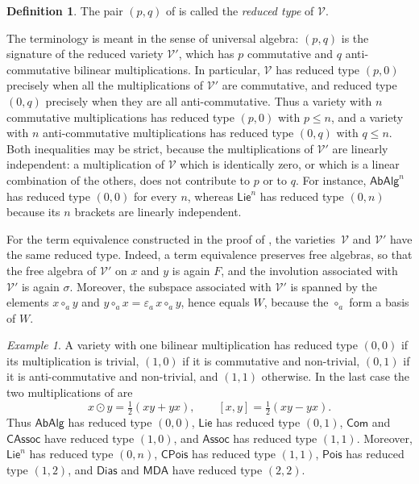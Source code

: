 \documentclass[reqno,a4paper]{amsart}
\theoremstyle{plain}
\theoremstyle{definition}
\newtheorem{definition}[subsection]{Definition}
\theoremstyle{remark}
\newtheorem{example}[subsection]{Example}
\numberwithin{equation}{section}
\newcommand{\V}{\mathcal{V}}
\newcommand{\Assoc}{\ensuremath{\mathsf{Assoc}}}
\newcommand{\Lie}{\ensuremath{\mathsf{Lie}}}
\newcommand{\Pois}{\ensuremath{\mathsf{Pois}}}
\newcommand{\CPois}{\ensuremath{\mathsf{CPois}}}
\newcommand{\CAssoc}{\ensuremath{\mathsf{CAssoc}}}
\newcommand{\Com}{\ensuremath{\mathsf{Com}}}
\newcommand{\AbAlg}{\ensuremath{\mathsf{AbAlg}}}
\newcommand{\Match}{\ensuremath{\mathsf{MDA}}}
\newcommand{\Dias}{\ensuremath{\mathsf{Dias}}}
\begin{document}
\begin{definition}\label{DefReducedType}
The pair $(p,q)$ of  is called the \emph{reduced type} of $\V$.
\end{definition}

The terminology is meant in the sense of universal algebra: $(p,q)$ is the signature of the reduced variety $\V'$, which has $p$ commutative and $q$ anti-commutative bilinear multiplications. In particular, $\V$ has reduced type $(p,0)$ precisely when all the multiplications of $\V'$ are commutative, and reduced type $(0,q)$ precisely when they are all anti-commutative. Thus a variety with $n$ commutative multiplications has reduced type $(p,0)$ with $p\leq n$, and a variety with $n$ anti-commutative multiplications has reduced type $(0,q)$ with $q\leq n$. Both inequalities may be strict, because the multiplications of $\V'$ are linearly independent: a multiplication of $\V$ which is identically zero, or which is a linear combination of the others, does not contribute to $p$ or to $q$. For instance, $\AbAlg^n$ has reduced type $(0,0)$ for every $n$, whereas $\Lie^n$ has reduced type $(0,n)$ because its $n$ brackets are linearly independent.

For the term equivalence constructed in the proof of , the varieties~$\V$ and $\V'$ have the same reduced type. Indeed, a term equivalence preserves free algebras, so that the free algebra of $\V'$ on $x$ and $y$ is again $F$, and the involution associated with $\V'$ is again $\sigma$. Moreover, the subspace associated with $\V'$ is spanned by the elements $x\circ_ay$ and $y\circ_ax=\varepsilon_a\,x\circ_ay$, hence equals $W$, because the $\circ_a$ form a basis of $W$.

\begin{example}\label{ExReducedType}
A variety with one bilinear multiplication has reduced type $(0,0)$ if its multiplication is trivial, $(1,0)$ if it is commutative and non-trivial, $(0,1)$ if it is anti-commutative and non-trivial, and $(1,1)$ otherwise. In the last case the two multiplications of  are
\[
x\odot y=\tfrac12(xy+yx),
\qquad
[x,y]=\tfrac12(xy-yx).
\]
Thus $\AbAlg$ has reduced type $(0,0)$, $\Lie$ has reduced type $(0,1)$, $\Com$ and $\CAssoc$ have reduced type $(1,0)$, and $\Assoc$ has reduced type $(1,1)$. Moreover, $\Lie^n$ has reduced type $(0,n)$, $\CPois$ has reduced type $(1,1)$, $\Pois$ has reduced type $(1,2)$, and $\Dias$ and $\Match$ have reduced type $(2,2)$.
\end{example}
\end{document}
